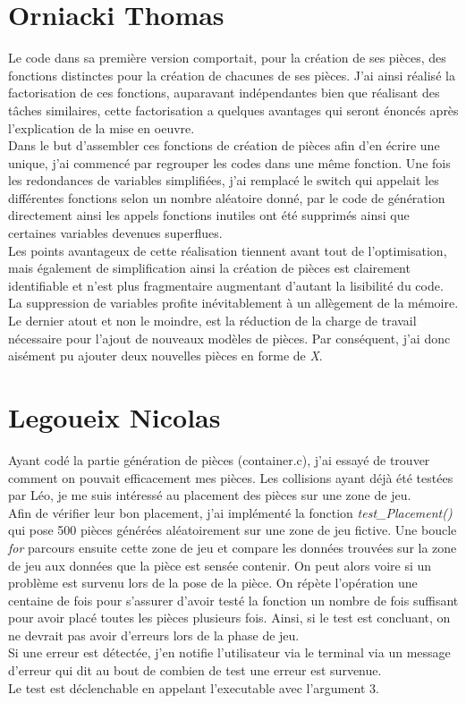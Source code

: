 \documentclass[11pt]{article}
\begin{document}
\section{Orniacki Thomas}
Le code dans sa première version comportait, pour la création de ses pièces, des fonctions distinctes pour la création de chacunes de ses pièces. J'ai ainsi réalisé la factorisation de ces fonctions, auparavant indépendantes bien que réalisant des tâches similaires, cette factorisation a quelques avantages qui seront énoncés après l'explication de la mise en oeuvre.\\
Dans le but d'assembler ces fonctions de création de pièces afin d'en écrire une unique, j'ai commencé par regrouper les codes dans une même fonction. Une fois les redondances de variables simplifiées, j'ai remplacé le switch qui appelait les différentes fonctions selon un nombre aléatoire donné, par le code de génération directement ainsi les appels fonctions inutiles ont été supprimés ainsi que certaines variables devenues superflues.\\
Les points avantageux de cette réalisation tiennent avant tout de l'optimisation, mais également de simplification ainsi la création de pièces est clairement identifiable et n'est plus fragmentaire augmentant d'autant la lisibilité du code. La suppression de variables profite inévitablement à un allègement de la mémoire. Le dernier atout et non le moindre, est la réduction de la charge de travail nécessaire pour l'ajout de nouveaux modèles de pièces. Par conséquent, j'ai donc aisément pu ajouter deux nouvelles pièces en forme de \emph{X}.

\section{Legoueix Nicolas}

Ayant codé la partie génération de pièces (container.c), j'ai essayé de trouver comment on pouvait efficacement mes pièces. Les collisions ayant déjà été testées par Léo, je me suis intéressé au placement des pièces sur une zone de jeu. \\
Afin de vérifier leur bon placement, j'ai implémenté la fonction \textit{test\_Placement()} qui pose 500 pièces générées aléatoirement sur une zone de jeu fictive. Une boucle \textit{for} parcours ensuite cette zone de jeu et compare les données trouvées sur la zone de jeu aux données que la pièce est sensée contenir. On peut alors voire si un problème est survenu lors de la pose de la pièce. On répète l'opération une centaine de fois pour s'assurer d'avoir testé la fonction un nombre de fois suffisant pour avoir placé toutes les pièces plusieurs fois. Ainsi, si le test est concluant, on ne devrait pas avoir d'erreurs lors de la phase de jeu.\\
Si une erreur est détectée, j'en notifie l'utilisateur via le terminal via un message d'erreur qui dit au bout de combien de test une erreur est survenue.\\
Le test est déclenchable en appelant l'executable avec l'argument 3.
\end{document}
